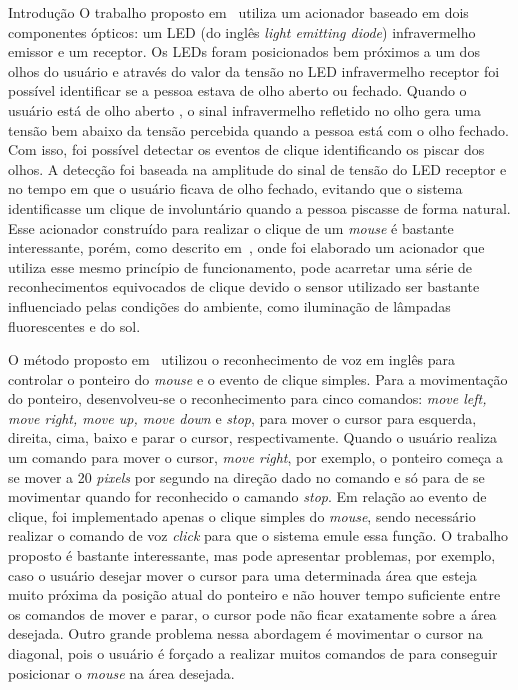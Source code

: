 \begin{chapter}{Introdução}
O trabalho proposto em~\cite{Skim10} utiliza um acionador baseado em dois
componentes ópticos: um LED (do inglês \textit{light emitting diode}) infravermelho
emissor e um receptor. Os LEDs foram posicionados bem próximos a um dos
olhos do usuário e através do valor da tensão no LED infravermelho receptor foi
possível identificar se a pessoa estava de olho aberto ou fechado. Quando o
usuário está de olho aberto , o sinal infravermelho refletido no olho gera uma
tensão bem abaixo da tensão percebida quando a pessoa está com o olho fechado.
Com isso, foi possível detectar os eventos de clique identificando os piscar dos
olhos. A detecção foi baseada na amplitude do sinal de tensão do LED receptor e
no tempo em que o usuário ficava de olho fechado, evitando que o sistema
identificasse um clique de involuntário quando a pessoa piscasse de forma
natural. Esse acionador construído para realizar o clique de um \textit{mouse} é
bastante interessante, porém, como descrito em~\cite{Batista17}, onde foi
elaborado um acionador que utiliza esse mesmo princípio de funcionamento, pode
acarretar uma série de reconhecimentos equivocados de clique devido o sensor
utilizado ser bastante influenciado pelas condições do ambiente, como iluminação
de lâmpadas fluorescentes e do sol.

O método proposto em~\cite{Karimullah02} utilizou o reconhecimento de voz em
inglês para controlar o ponteiro do \textit{mouse} e o evento de clique simples.
Para a movimentação do ponteiro, desenvolveu-se o reconhecimento para cinco
comandos: \textit{move left, move right, move up, move down} e \textit{stop},
para mover o cursor para esquerda, direita, cima, baixo e parar o cursor,
respectivamente. Quando o usuário realiza um comando para mover o cursor,
\textit{move right}, por exemplo, o ponteiro começa a se mover a 20
\textit{pixels} por segundo na direção dado no comando e só para de se
movimentar quando for reconhecido o camando \textit{stop}. Em relação ao evento
de clique, foi implementado apenas o clique simples do \textit{mouse}, sendo
necessário realizar o comando de voz \textit{click} para que o sistema emule
essa função. O trabalho proposto é bastante interessante, mas pode apresentar
problemas, por exemplo, caso o usuário desejar mover o cursor para uma
determinada área que esteja muito próxima da posição atual do ponteiro e não
houver tempo suficiente entre os comandos de mover e parar, o cursor pode não
ficar exatamente sobre a área desejada. Outro grande problema nessa abordagem é
movimentar o cursor na diagonal, pois o usuário é forçado a realizar muitos
comandos de para conseguir posicionar o \textit{mouse} na área desejada.   


\end{chapter}
